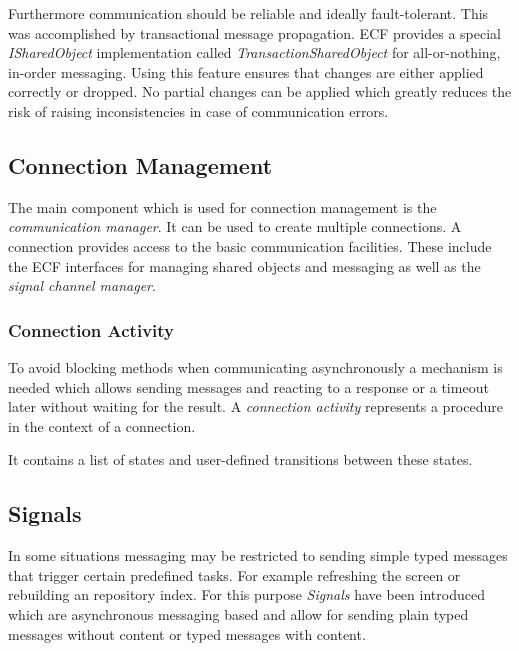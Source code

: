 Furthermore communication should be reliable and ideally fault-tolerant. This
was accomplished by transactional message propagation. ECF provides a
special \emph{ISharedObject} implementation called \emph{TransactionSharedObject}
for all-or-nothing, in-order messaging. Using this feature ensures that changes
are either applied correctly or dropped. No partial changes can be applied
which greatly reduces the risk of raising inconsistencies in case of communication
errors.

\subsection{Connection Management}
The main component which is used for connection management is the \emph{communication manager}.
It can be used to create multiple connections. A connection provides access
to the basic communication facilities. These include the ECF interfaces
for managing shared objects and messaging as well as the \emph{signal channel manager}.

\subsubsection{Connection Activity}
To avoid blocking methods when communicating asynchronously a mechanism
is needed which allows sending messages and reacting to a response
or a timeout later without waiting for the result.
A \emph{connection activity} represents a procedure in the context of a connection.

It contains a list of states and user-defined transitions between these
states.

\subsection{Signals}
In some situations messaging may be restricted to sending simple typed
messages that trigger certain predefined tasks. For example refreshing
the screen or rebuilding an repository index. For this purpose \emph{Signals}
have been introduced which are asynchronous messaging based and allow
for sending plain typed messages without content or typed messages with
content.



